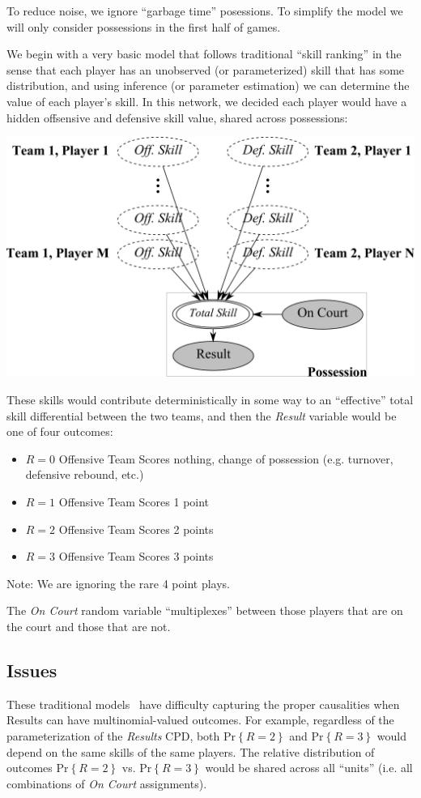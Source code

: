 \documentclass[10pt,twocolumn]{article}
\newcommand{\prb}[1]{\ensuremath{  \mathrm{Pr}\left\{ #1 \right\}  }}
\begin{document}
To reduce noise, we ignore ``garbage time'' posessions. To simplify the model we will only consider possessions in the first half of games.

We begin with a very basic model that follows traditional ``skill ranking'' in the sense that each player has an unobserved (or parameterized) skill that has some distribution, and using inference (or parameter estimation) we can determine the value of each player's skill.
In this network, we decided each player would have a hidden offsensive and defensive skill value, shared across possessions:
\begin{center}
	\includegraphics[width=0.90\linewidth]{figures/network}
\end{center}
These skills would contribute deterministically in some way to an ``effective'' total skill differential between the two teams, and then the \emph{Result} variable would be one of four outcomes:
\begin{itemize}
\item $R=0$ Offensive Team Scores nothing, change of possession (e.g. turnover, defensive rebound, etc.)
\item $R=1$ Offensive Team Scores 1 point
\item $R=2$ Offensive Team Scores 2 points
\item $R=3$ Offensive Team Scores 3 points
\end{itemize}

Note: We are ignoring the rare 4 point plays. 

The \emph{On Court} random variable ``multiplexes'' between those players that are on the court and those that are not.

\subsection{Issues}
\label{sec:badnetwork}
These traditional models~\cite{herbrich2007trueskilltm} have difficulty capturing the proper causalities when Results can have multinomial-valued outcomes.
For example, regardless of the parameterization of the \emph{Results} CPD, both $\prb{ R = 2}$ and $\prb{R= 3}$ would depend on the same skills of the same players.
The relative distribution of outcomes $\prb{R = 2}$ vs. $\prb{R = 3}$ would be shared across all ``units'' (i.e. all combinations of \emph{On Court} assignments).
\end{document}
